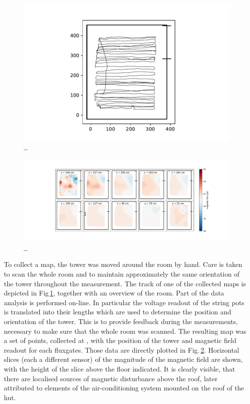 \begin{figure}
  \centering
  \includegraphics[width=0.9\linewidth]{gfx/mapping/lpsc/bastille_crane_away_rep_track.pdf}
  \caption{\ldots}
  \label{fig:mapping_bastille_track}
\end{figure}

\begin{figure}
  \centering
  \includegraphics[width=\linewidth]{gfx/mapping/lpsc/bastille_crane_away_rep_magnitude.pdf}
  \caption{\ldots}
  \label{fig:mapping_bastille_magnitude}
\end{figure}

To collect a map, the tower was moved around the room by hand. Care is taken to scan the whole room and to maintain approximately the same orientation of the tower throughout the measurement. The track of one of the collected maps is depicted in Fig\,\ref{fig:mapping_bastille_track}, together with an overview of the room.  Part of the data analysis is performed on-line. In particular the voltage readout of the string pots is translated into their lengths which are used to determine the position and orientation of the tower. This is to provide feedback during the measurements, necessary to make sure that the whole room was scanned. The resulting map was a set of points, collected at , with the position of the tower and magnetic field readout for each fluxgates. Those data are directly plotted in Fig.\,\ref{fig:mapping_bastille_magnitude}. Horizontal slices (each a different sensor) of the magnitude of the magnetic field are shown, with the height of the slice above the floor indicated. It is clearly visible, that there are localised sources of magnetic disturbance above the roof, later attributed to elements of the air-conditioning system mounted on the roof of the hut.

